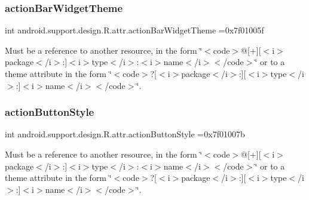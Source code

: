 \subsubsection{\texorpdfstring{action\+Bar\+Widget\+Theme}{actionBarWidgetTheme}}
{\footnotesize\ttfamily int android.\+support.\+design.\+R.\+attr.\+action\+Bar\+Widget\+Theme =0x7f01005f\hspace{0.3cm}{\ttfamily [static]}}

Must be a reference to another resource, in the form \char`\"{}$<$code$>$@\mbox{[}+\mbox{]}\mbox{[}$<$i$>$package$<$/i$>$\+:\mbox{]}$<$i$>$type$<$/i$>$\+:$<$i$>$name$<$/i$>$$<$/code$>$\char`\"{} or to a theme attribute in the form \char`\"{}$<$code$>$?\mbox{[}$<$i$>$package$<$/i$>$\+:\mbox{]}\mbox{[}$<$i$>$type$<$/i$>$\+:\mbox{]}$<$i$>$name$<$/i$>$$<$/code$>$\char`\"{}. \mbox{\label{classandroid_1_1support_1_1design_1_1R_1_1attr_a6964dc5822bfe14e17b180380fe43d25}} 
\subsubsection{\texorpdfstring{action\+Button\+Style}{actionButtonStyle}}
{\footnotesize\ttfamily int android.\+support.\+design.\+R.\+attr.\+action\+Button\+Style =0x7f01007b\hspace{0.3cm}{\ttfamily [static]}}

Must be a reference to another resource, in the form \char`\"{}$<$code$>$@\mbox{[}+\mbox{]}\mbox{[}$<$i$>$package$<$/i$>$\+:\mbox{]}$<$i$>$type$<$/i$>$\+:$<$i$>$name$<$/i$>$$<$/code$>$\char`\"{} or to a theme attribute in the form \char`\"{}$<$code$>$?\mbox{[}$<$i$>$package$<$/i$>$\+:\mbox{]}\mbox{[}$<$i$>$type$<$/i$>$\+:\mbox{]}$<$i$>$name$<$/i$>$$<$/code$>$\char`\"{}. \mbox{\label{classandroid_1_1support_1_1design_1_1R_1_1attr_a51dfb6b1d3d9ab814d446239f5179560}} 

